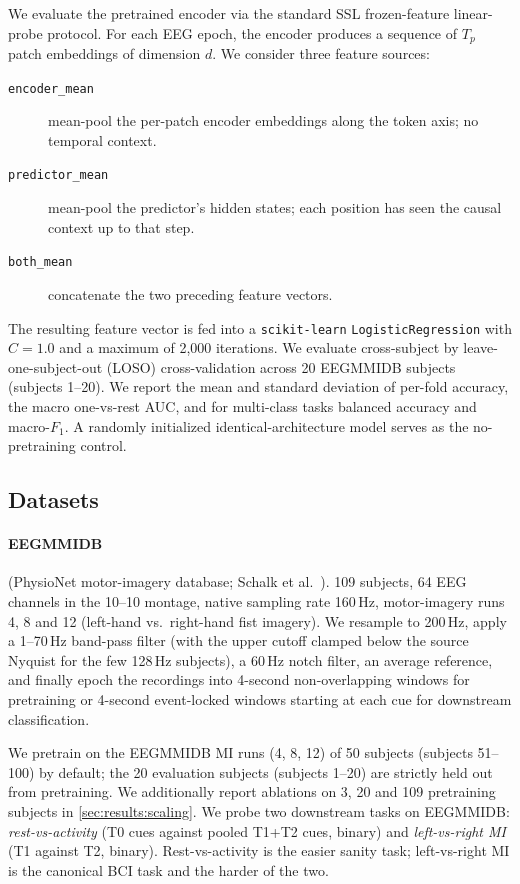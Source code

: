 We evaluate the pretrained encoder via the standard SSL frozen-feature
linear-probe protocol. For each EEG epoch, the encoder produces a sequence
of $T_p$ patch embeddings of dimension $d$. We consider three feature
sources:
\begin{description}
  \item[\texttt{encoder\_mean}] mean-pool the per-patch encoder embeddings
    along the token axis; no temporal context.
  \item[\texttt{predictor\_mean}] mean-pool the predictor's hidden states;
    each position has seen the causal context up to that step.
  \item[\texttt{both\_mean}] concatenate the two preceding feature vectors.
\end{description}
The resulting feature vector is fed into a \texttt{scikit-learn}
\texttt{LogisticRegression} with $C{=}1.0$ and a maximum of 2{,}000
iterations. We evaluate cross-subject by leave-one-subject-out (LOSO)
cross-validation across 20 EEGMMIDB subjects (subjects 1--20). We report
the mean and standard deviation of per-fold accuracy, the macro one-vs-rest
AUC, and for multi-class tasks balanced accuracy and macro-$F_1$. A
randomly initialized identical-architecture model serves as the
no-pretraining control.

\subsection{Datasets}
\label{sec:method:data}

\paragraph{EEGMMIDB} (PhysioNet motor-imagery database; Schalk et
al.~\cite{eegmmidb2004}). 109 subjects, 64 EEG channels in the 10--10
montage, native sampling rate 160\,Hz, motor-imagery runs 4, 8 and 12
(left-hand vs.\ right-hand fist imagery). We resample to 200\,Hz, apply a
1--70\,Hz band-pass filter (with the upper cutoff clamped below the
source Nyquist for the few 128\,Hz subjects), a 60\,Hz notch filter, an
average reference, and finally epoch the recordings into 4-second
non-overlapping windows for pretraining or 4-second event-locked windows
starting at each cue for downstream classification.

We pretrain on the EEGMMIDB MI runs (4, 8, 12) of 50 subjects (subjects
51--100) by default; the 20 evaluation subjects (subjects 1--20) are
strictly held out from pretraining. We additionally report
ablations on 3, 20 and 109 pretraining subjects in
\cref{sec:results:scaling}. We probe two downstream tasks on
EEGMMIDB:
\emph{rest-vs-activity} (T0 cues against pooled T1+T2 cues, binary) and
\emph{left-vs-right MI} (T1 against T2, binary). Rest-vs-activity is the
easier sanity task; left-vs-right MI is the canonical BCI task and the
harder of the two.

